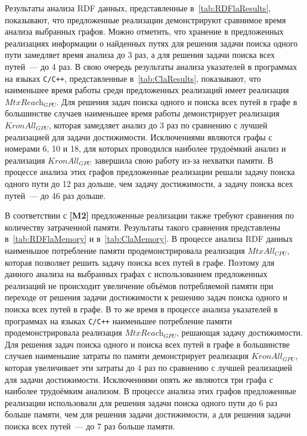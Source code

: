 Результаты анализа RDF данных, представленные в~\cref{tab:RDFlaResults}, показывают, что предложенные реализации демонстрируют сравнимое время анализа выбранных графов. Можно отметить, что хранение в предложенных реализациях информации о найденных путях для решения задачи поиска одного пути замедляет время анализа до 3 раз, а для решения задачи поиска всех путей~--- до 4 раз. В свою очередь результаты анализа указателей в программах на языках \texttt{C/C++}, представленные в~\cref{tab:ClaResults}, показывают, что наименьшее время работы среди предложенных реализаций имеет реализация $\textit{MtxReach}_{\textit{GPU}}$. Для решения задач поиска одного и поиска всех путей в графе в большинстве случаев наименьшее время работы демонстрирует реализация $\textit{KronAll}_{\textit{GPU}}$, которая замедляет анализ до 3 раз по сравнению с лучшей реализацией для задачи достижимости. Исключениями являются графы с номерами 6, 10 и 18, для которых проводился наиболее трудоёмкий анализ и реализация $\textit{KronAll}_{\textit{GPU}}$ завершила свою работу из-за нехватки памяти. В процессе анализа этих графов предложенные реализации решали задачу поиска одного пути до 12 раз дольше, чем задачу достижимости, а задачу поиска всех путей~--- до 46 раз дольше.

В соответствии с \textbf{[M2]} предложенные реализации также требуют сравнения по количеству затраченной памяти. Результаты такого сравнения представлены в~\cref{tab:RDFlaMemory} и в~\cref{tab:ClaMemory}. В процессе анализа RDF данных наименьшое потребление памяти продемонстрировала реализация $\textit{MtxAll}_{\textit{CPU}}$, которая позволяет решить задачу поиска всех путей в графе. Поэтому для данного анализа на выбранных графах с использованием предложенных реализаций не происходит увеличение объёмов потребляемой памяти при переходе от решения задачи достижимости к решению задач поиска одного и поиска всех путей в графе. В то же время в процессе анализа указателей в программах на языках \texttt{C/C++} наименьшее потребление памяти продемонстрировала реализация $\textit{MtxReach}_{\textit{GPU}}$, решающая задачу достижимости. Для решения задач поиска одного и поиска всех путей в графе в большинстве случаев наименьшие затраты по памяти демонстрирует реализация $\textit{KronAll}_{\textit{GPU}}$, которая увеличивает эти затраты до 4 раз по сравнению с лучшей реализацией для задачи достижимости. Исключениями опять же являются три графа с наиболее трудоёмким анализом. В процессе анализа этих графов предложенные реализации использовали для решения задачи поиска одного пути до 6 раз больше памяти, чем для решения задачи достижимости, а для решения задачи поиска всех путей~--- до 7 раз больше памяти.

